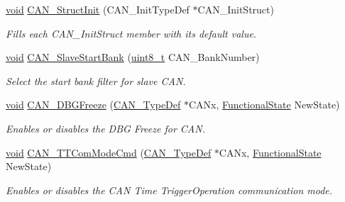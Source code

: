 \begin{DoxyCompactItemize}
\hyperlink{group___n_a_m_e_ga18028b8badbf1ea7e704ccac3c488e82}{void} \hyperlink{group___c_a_n___group1_gad77ad810868ed111755fc9e8ae0c7646}{C\-A\-N\-\_\-\-Struct\-Init} (C\-A\-N\-\_\-\-Init\-Type\-Def $\ast$C\-A\-N\-\_\-\-Init\-Struct)
\begin{DoxyCompactList}\small\item\em Fills each C\-A\-N\-\_\-\-Init\-Struct member with its default value. \end{DoxyCompactList}\item 
\hyperlink{group___n_a_m_e_ga18028b8badbf1ea7e704ccac3c488e82}{void} \hyperlink{group___c_a_n___group1_ga109ff8960bc59f44b984c9646f17b3c0}{C\-A\-N\-\_\-\-Slave\-Start\-Bank} (\hyperlink{stdint_8h_aba7bc1797add20fe3efdf37ced1182c5}{uint8\-\_\-t} C\-A\-N\-\_\-\-Bank\-Number)
\begin{DoxyCompactList}\small\item\em Select the start bank filter for slave C\-A\-N. \end{DoxyCompactList}\item 
\hyperlink{group___n_a_m_e_ga18028b8badbf1ea7e704ccac3c488e82}{void} \hyperlink{group___c_a_n___group1_gac0e2d33e08caf49d1f1251f0dcc20213}{C\-A\-N\-\_\-\-D\-B\-G\-Freeze} (\hyperlink{struct_c_a_n___type_def}{C\-A\-N\-\_\-\-Type\-Def} $\ast$C\-A\-Nx, \hyperlink{group___exported__types_gac9a7e9a35d2513ec15c3b537aaa4fba1}{Functional\-State} New\-State)
\begin{DoxyCompactList}\small\item\em Enables or disables the D\-B\-G Freeze for C\-A\-N. \end{DoxyCompactList}\item 
\hyperlink{group___n_a_m_e_ga18028b8badbf1ea7e704ccac3c488e82}{void} \hyperlink{group___c_a_n___group1_ga94740177bab153ca5b102d122f9a8cca}{C\-A\-N\-\_\-\-T\-T\-Com\-Mode\-Cmd} (\hyperlink{struct_c_a_n___type_def}{C\-A\-N\-\_\-\-Type\-Def} $\ast$C\-A\-Nx, \hyperlink{group___exported__types_gac9a7e9a35d2513ec15c3b537aaa4fba1}{Functional\-State} New\-State)
\begin{DoxyCompactList}\small\item\em Enables or disables the C\-A\-N Time Trigger\-Operation communication mode. \end{DoxyCompactList}\end{DoxyCompactItemize}


